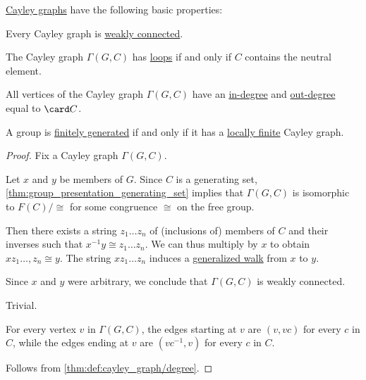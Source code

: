 \begin{proposition}\label{thm:def:cayley_graph}
  \hyperref[def:cayley_graph]{Cayley graphs} have the following basic properties:
  \begin{thmenum}
     Every Cayley graph is \hyperref[def:graph_connectedness/weak]{weakly connected}.

     The Cayley graph \( \Gamma(G, C) \) has \hyperref[def:directed_multigraph/loop]{loops} if and only if \( C \) contains the neutral element.

     All vertices of the Cayley graph \( \Gamma(G, C) \) have an \hyperref[def:graph_cardinality/directed_degree]{in-degree} and \hyperref[def:graph_cardinality/directed_degree]{out-degree} equal to \( \card C \).

     A group is \hyperref[def:group_presentation]{finitely generated} if and only if it has a \hyperref[def:graph_cardinality/local]{locally finite} Cayley graph.
  \end{thmenum}
\end{proposition}
\begin{proof}
   Fix a Cayley graph \( \Gamma(G, C) \).

  Let \( x \) and \( y \) be members of \( G \). Since \( C \) is a generating set, \cref{thm:group_presentation_generating_set} implies that \( \Gamma(G, C) \) is isomorphic to \( F(C) / {\cong} \) for some congruence \( {\cong} \) on the free group.

  Then there exists a string \( z_1 \ldots z_n \) of (inclusions of) members of \( C \) and their inverses such that \( x^{-1} y \cong z_1 \ldots z_n \). We can thus multiply by \( x \) to obtain \( x z_1 \ldots, z_n \cong y \). The string \( x z_1 \ldots z_n \) induces a \hyperref[def:graph_walk/generalized]{generalized walk} from \( x \) to \( y \).

  Since \( x \) and \( y \) were arbitrary, we conclude that \( \Gamma(G, C) \) is weakly connected.

   Trivial.

   For every vertex \( v \) in \( \Gamma(G, C) \), the edges starting at \( v \) are \( (v, vc) \) for every \( c \) in \( C \), while the edges ending at \( v \) are \( (vc^{-1}, v) \) for every \( c \) in \( C \).

   Follows from \cref{thm:def:cayley_graph/degree}.
\end{proof}

